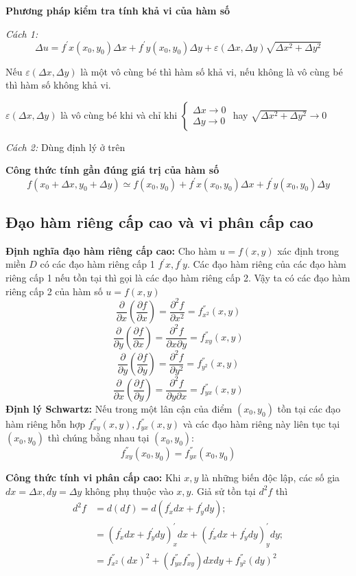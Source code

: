 \documentclass[12pt, a4paper]{article}
\begin{document}
	\textbf {Phương pháp kiểm tra tính khả vi của hàm số }
	
	\textit {Cách 1:}
	\[ \Delta u = f^{'}x (x_0,y_0) \Delta x + f^{'}y (x_0,y_0) \Delta y + \varepsilon (\Delta x, \Delta y) \sqrt{\Delta x^2 + \Delta y^2} \]
	
	Nếu $ \varepsilon (\Delta x, \Delta y) $ là một vô cùng bé thì hàm số khả vi, nếu không là vô cùng bé thì hàm số không khả vi.
	
	$ \varepsilon (\Delta x, \Delta y) $ là vô cùng bé khi và chỉ khi 
	$\begin{cases}
	 \Delta x \to 0 \\
	 \Delta y \to 0 
	\end{cases}$
	hay $ \sqrt{\Delta x^2 + \Delta y^2} \to 0 $
	
	\textit {Cách 2:} Dùng định lý ở trên
	
	\medskip
	
	\textbf {Công thức tính gần đúng giá trị của hàm số }
	\[ f(x_0+\Delta x, y_0+\Delta y) \simeq f(x_0,y_0) + f^{'}x(x_0,y_0)\Delta x + f^{'}y(x_0,y_0)\Delta y\]
	
	\subsection{Đạo hàm riêng cấp cao và vi phân cấp cao}
	\textbf {Định nghĩa đạo hàm riêng cấp cao:} Cho hàm $ u=f(x,y) $ xác định trong miền $ D $ có các đạo hàm riêng cấp 1 $ f^{'}x, f^{'}y $. Các đạo hàm riêng của các đạo hàm riêng cấp 1 nếu tồn tại thì gọi là các đạo hàm riêng cấp 2. Vậy ta có các đạo hàm riêng cấp 2 của hàm số $ u=f(x,y) $
	\[\dfrac {\partial}{\partial x}(\dfrac {\partial f}{\partial x}) = \dfrac {\partial^2 f}{\partial x^2} = f^{''}_{x^2}(x,y) \]
	\[\dfrac {\partial}{\partial y}(\dfrac {\partial f}{\partial x}) = \dfrac {\partial^2 f}{\partial x\partial y} = f^{''}_{xy}(x,y) \]
	\[\dfrac {\partial}{\partial y}(\dfrac {\partial f}{\partial y}) = \dfrac {\partial^2 f}{\partial y^2} = f^{''}_{y^2}(x,y) \]
	\[\dfrac {\partial}{\partial x}(\dfrac {\partial f}{\partial y}) = \dfrac {\partial^2 f}{\partial y\partial x} = f^{''}_{yx}(x,y) \]
	\textbf {Định lý Schwartz:} Nếu trong một lân cận của điểm $ (x_0, y_0) $ tồn tại các đạo hàm riêng hỗn hợp $ f^{''}_{xy}(x,y), f^{''}_{yx}(x,y) $ và các đạo hàm riêng này liên tục tại $ (x_0, y_0) $ thì chúng bằng nhau tại $ (x_0, y_0) $:
	\[  f^{''}_{xy}(x_0,y_0) = f^{''}_{yx}(x_0,y_0)  \]
	
	\textbf {Công thức tính vi phân cấp cao:} Khi $ x, y $ là những biến độc lập, các số gia $ dx=\Delta x, dy=\Delta y $ không phụ thuộc vào $ x, y $. Giả sử tồn tại $ d^2f $ thì
	\begin{align*}
		d^2f&=d(df)=d(f^{'}_xdx + f^{'}_ydy);\\
		&=(f^{'}_xdx + f^{'}_ydy)^{'}_xdx + (f^{'}_xdx + f^{'}_ydy)^{'}_ydy; \\
		&=f^{''}_{x^2}(dx)^2 +(f^{''}_{yx}f^{''}_{xy})dxdy + f^{''}_{y^2}(dy)^2
	\end{align*}
	
\end{document}
